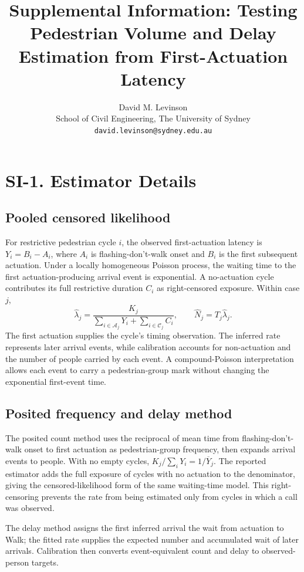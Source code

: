 \documentclass[11pt]{article}
\title{\textbf{Supplemental Information: Testing Pedestrian Volume and Delay Estimation from First-Actuation Latency}}
\author{David M. Levinson\\
\small School of Civil Engineering, The University of Sydney\\
\small \texttt{david.levinson@sydney.edu.au}}
\date{}
\begin{document}
\maketitle

\section*{SI-1. Estimator Details}

\subsection*{Pooled censored likelihood}

For restrictive pedestrian cycle \(i\), the observed first-actuation latency is \(Y_i=B_i-A_i\), where \(A_i\) is flashing-don't-walk onset and \(B_i\) is the first subsequent actuation. Under a locally homogeneous Poisson process, the waiting time to the first actuation-producing arrival event is exponential. A no-actuation cycle contributes its full restrictive duration \(C_i\) as right-censored exposure. Within case \(j\),
\begin{equation}
\hat\lambda_j=
\frac{K_j}{\sum_{i\in\mathcal A_j}Y_i+\sum_{i\in\mathcal C_j}C_i},
\qquad
\hat N_j=T_j\hat\lambda_j.
\end{equation}
The first actuation supplies the cycle's timing observation. The inferred rate represents later arrival events, while calibration accounts for non-actuation and the number of people carried by each event. A compound-Poisson interpretation allows each event to carry a pedestrian-group mark without changing the exponential first-event time.

\subsection*{Posited frequency and delay method}

The posited count method uses the reciprocal of mean time from flashing-don't-walk onset to first actuation as pedestrian-group frequency, then expands arrival events to people. With no empty cycles, \(K_j/\sum_iY_i=1/\overline Y_j\). The reported estimator adds the full exposure of cycles with no actuation to the denominator, giving the censored-likelihood form of the same waiting-time model. This right-censoring prevents the rate from being estimated only from cycles in which a call was observed.

The delay method assigns the first inferred arrival the wait from actuation to Walk; the fitted rate supplies the expected number and accumulated wait of later arrivals. Calibration then converts event-equivalent count and delay to observed-person targets.
\end{document}
